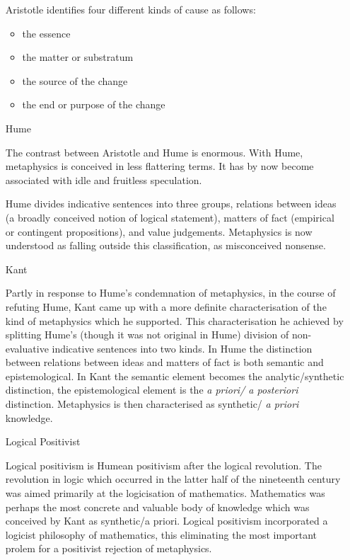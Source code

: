 \documentclass{rbjk}
\begin{document}
\begin{article}
\begin{itemize}
Aristotle identifies four different kinds of cause as follows:

\begin{itemize}
\item the essence
\item the matter or substratum
\item the source of the change
\item the end or purpose of the change
\end{itemize}

\item[Hume]

The contrast between Aristotle and Hume is enormous.
With Hume, metaphysics is conceived in less flattering terms.
It has by now become associated with idle and fruitless speculation.

Hume divides indicative sentences into three groups, relations between ideas (a broadly conceived notion of logical statement), matters of fact (empirical or contingent propositions), and value judgements.
Metaphysics is now understood as falling outside this classification, as misconceived nonsense.

\item[Kant]

Partly in response to Hume's condemnation of metaphysics, in the course of refuting Hume, Kant came up with a more definite characterisation of the kind of metaphysics which he supported.
This characterisation he achieved by splitting Hume's (though it was not original in Hume) division of non-evaluative indicative sentences into two kinds.
In Hume the distinction between relations between ideas and matters of fact is both semantic and epistemological.
In Kant the semantic element becomes the analytic/synthetic distinction, the epistemological element is the {\it a priori/ a posteriori} distinction.
Metaphysics is then characterised as synthetic/ {\it a priori} knowledge.

\item[Logical Positivist]

Logical positivism is Humean positivism after the logical revolution.
The revolution in logic which occurred in the latter half of the nineteenth century was aimed primarily at the logicisation of mathematics.
Mathematics was perhaps the most concrete and valuable body of knowledge which was conceived by Kant as synthetic/a priori.
Logical positivism incorporated a logicist philosophy of mathematics, this eliminating the most important prolem for a positivist rejection of metaphysics.


\end{itemize}
\end{article}
\end{document}

